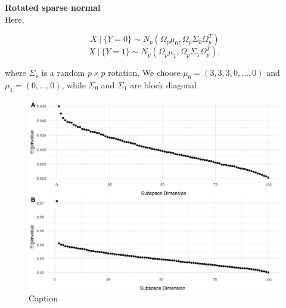 \documentclass[12pt]{article}
\begin{document}


\textbf{Rotated sparse normal}\\
Here,

\[X \ | \ \{Y = 0\} \sim N_p(\Omega_p\mu_0, \Omega_p \Sigma_0 \Omega_p^T)  \] 
\[X \ | \ \{Y = 1\} \sim N_p(\Omega_p\mu_1, \Omega_p\Sigma_1\Omega_p^T),  \]

where $\Sigma_p$ is a random $p\times p$ rotation. We choose $\mu_0 = (3, 3, 3, 0, \ldots, 0)$ and $\mu_1 = (0, \ldots, 0)$, while $\Sigma_0$ and $\Sigma_1$ are block diagonal


\begin{figure}
    \centering
    \includegraphics[width=6in]{../results/figures/sim_evs.png}
    \caption{Caption}
    \label{fig:sim_evs}
\end{figure}
\end{document}
